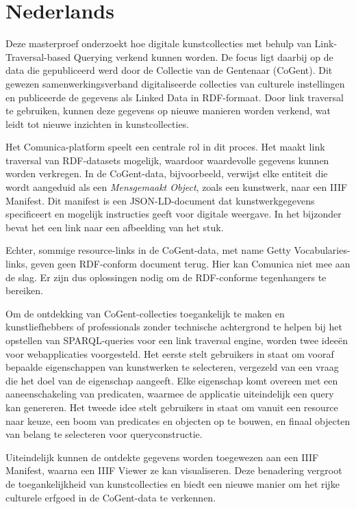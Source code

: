 \newpage
{}
\pagestyle{plainpage}

\section*{Nederlands}

Deze masterproef onderzoekt hoe digitale kunstcollecties met behulp van Link-Traversal-based Querying verkend kunnen worden. De focus ligt daarbij op de data die gepubliceerd werd door de Collectie van de Gentenaar (CoGent). Dit gewezen samenwerkingsverband digitaliseerde collecties van culturele instellingen en publiceerde de gegevens als Linked Data in RDF-formaat. Door link traversal te gebruiken, kunnen deze gegevens op nieuwe manieren worden verkend, wat leidt tot nieuwe inzichten in kunstcollecties.

Het Comunica-platform speelt een centrale rol in dit proces. Het maakt link traversal van RDF-datasets mogelijk, waardoor waardevolle gegevens kunnen worden verkregen. In de CoGent-data, bijvoorbeeld, verwijst elke entiteit die wordt aangeduid als een \textit{Mensgemaakt Object}, zoals een kunstwerk, naar een IIIF Manifest. Dit manifest is een JSON-LD-document dat kunstwerkgegevens specificeert en mogelijk instructies geeft voor digitale weergave. In het bijzonder bevat het een link naar een afbeelding van het stuk.

Echter, sommige resource-links in de CoGent-data, met name Getty Vocabularies-links, geven geen RDF-conform document terug. Hier kan Comunica niet mee aan de slag. Er zijn dus oplossingen nodig om de RDF-conforme tegenhangers te bereiken.

Om de ontdekking van CoGent-collecties toegankelijk te maken en kunstliefhebbers of professionals zonder technische achtergrond te helpen bij het opstellen van SPARQL-queries voor een link traversal engine, worden twee ideeën voor webapplicaties voorgesteld. Het eerste stelt gebruikers in staat om vooraf bepaalde eigenschappen van kunstwerken te selecteren, vergezeld van een vraag die het doel van de eigenschap aangeeft. Elke eigenschap komt overeen met een aaneenschakeling van predicaten, waarmee de applicatie uiteindelijk een query kan genereren. Het tweede idee stelt gebruikers in staat om vanuit een resource naar keuze, een boom van predicates en objecten op te bouwen, en finaal objecten van belang te selecteren voor queryconstructie.

Uiteindelijk kunnen de ontdekte gegevens worden toegewezen aan een IIIF Manifest, waarna een IIIF Viewer ze kan visualiseren. Deze benadering vergroot de toegankelijkheid van kunstcollecties en biedt een nieuwe manier om het rijke culturele erfgoed in de CoGent-data te verkennen.